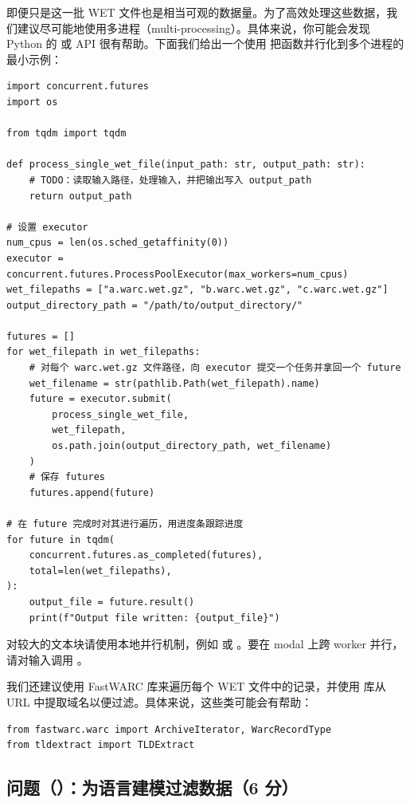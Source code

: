 即便只是这一批 WET 文件也是相当可观的数据量。为了高效处理这些数据，我们建议尽可能地使用多进程（multi-processing）。具体来说，你可能会发现 Python 的  或  API 很有帮助。下面我们给出一个使用  把函数并行化到多个进程的最小示例：

\begin{lstlisting}
import concurrent.futures
import os

from tqdm import tqdm

def process_single_wet_file(input_path: str, output_path: str):
    # TODO：读取输入路径，处理输入，并把输出写入 output_path
    return output_path

# 设置 executor
num_cpus = len(os.sched_getaffinity(0))
executor = concurrent.futures.ProcessPoolExecutor(max_workers=num_cpus)
wet_filepaths = ["a.warc.wet.gz", "b.warc.wet.gz", "c.warc.wet.gz"]
output_directory_path = "/path/to/output_directory/"

futures = []
for wet_filepath in wet_filepaths:
    # 对每个 warc.wet.gz 文件路径，向 executor 提交一个任务并拿回一个 future
    wet_filename = str(pathlib.Path(wet_filepath).name)
    future = executor.submit(
        process_single_wet_file,
        wet_filepath,
        os.path.join(output_directory_path, wet_filename)
    )
    # 保存 futures
    futures.append(future)

# 在 future 完成时对其进行遍历，用进度条跟踪进度
for future in tqdm(
    concurrent.futures.as_completed(futures),
    total=len(wet_filepaths),
):
    output_file = future.result()
    print(f"Output file written: {output_file}")
\end{lstlisting}

对较大的文本块请使用本地并行机制，例如  或 。要在 modal 上跨 worker 并行，请对输入调用 。

我们还建议使用 FastWARC 库来遍历每个 WET 文件中的记录，并使用  库从 URL 中提取域名以便过滤。具体来说，这些类可能会有帮助：

\begin{lstlisting}
from fastwarc.warc import ArchiveIterator, WarcRecordType
from tldextract import TLDExtract
\end{lstlisting}

\subsection*{问题（）：为语言建模过滤数据（6 分）}

